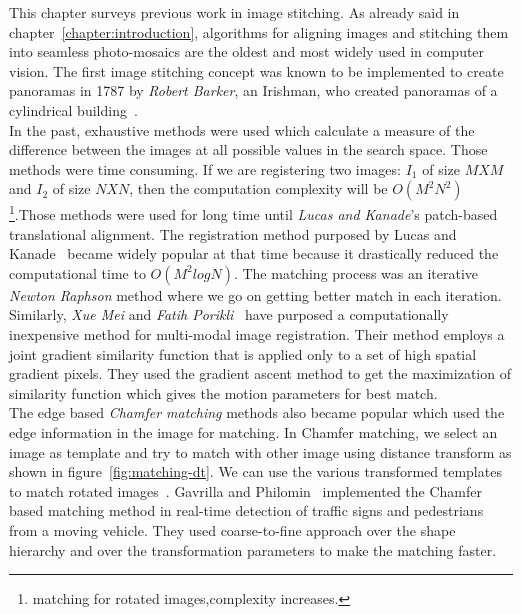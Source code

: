 This chapter surveys previous work in image stitching. As already said in chapter~\ref{chapter:introduction}, algorithms for aligning images and stitching them into seamless photo-mosaics are the oldest and most widely used in computer vision. The first image stitching concept was known to be implemented to create panoramas in 1787 by \emph{Robert Barker}, an Irishman, who created panoramas of a cylindrical building~\cite{Woeste:09}.\\

\noindent In the past, exhaustive methods were used which calculate a measure of the difference between the images at all possible values in the search space. Those methods were time consuming. If we are registering two images: $I_1$ of size $M X M$ and $I_2$ of size $N X N$, then the computation complexity will be $O(M^2N^2)$ \footnote{matching for rotated images,complexity increases.}.Those methods were used for long time until \emph{Lucas and Kanade}'s patch-based translational alignment\cite{Lucas:81}. The registration method purposed by Lucas and Kanade~\cite{Lucas:81} became widely popular at that time because it drastically reduced the computational time to $O(M^2 log N)$. The matching process was an iterative \emph{Newton Raphson} method where we go on getting better match in each iteration. \\ 

\noindent Similarly, \emph{Xue Mei} and \emph{Fatih Porikli}~\cite{Mei:06} have purposed a computationally inexpensive method for multi-modal image registration. Their method employs a joint gradient similarity function that is applied only to a set of high spatial gradient pixels. They used the gradient ascent method to get the maximization of similarity function which gives the motion parameters for best match. \\ 

 

\noindent The edge based \emph{Chamfer matching} methods also became popular which used the edge information in the image for matching. In Chamfer matching, we select an image as template and try to match with other image using distance transform as shown in figure~\ref{fig:matching-dt}. We can use the various transformed templates to match rotated images~\cite{Gavrila:98}. Gavrilla and Philomin~\cite{Gavrila:99} implemented the Chamfer based matching method in real-time detection of traffic signs and pedestrians from a moving vehicle. They used coarse-to-fine approach over the shape hierarchy and over the transformation parameters to make the matching faster.\\ 

